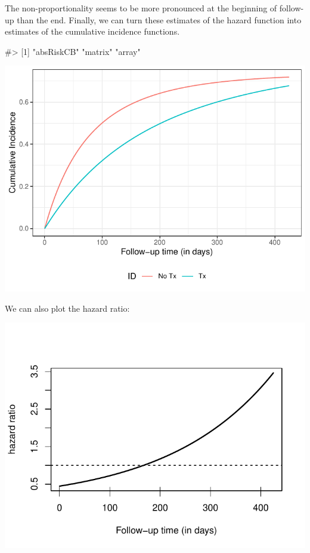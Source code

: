 \documentclass[
]{jss}
\begin{document}
The non-proportionality seems to be more pronounced at the beginning of
follow-up than the end. Finally, we can turn these estimates of the
hazard function into estimates of the cumulative incidence functions.

\begin{CodeChunk}

\begin{CodeOutput}
#> [1] "absRiskCB" "matrix"    "array"
\end{CodeOutput}


\begin{center}\includegraphics[width=\textwidth,keepaspectratio=true]{../figures/stanford-risk-1} \end{center}

\end{CodeChunk}

We can also plot the hazard ratio:

\begin{CodeChunk}


\begin{center}\includegraphics[width=\textwidth,keepaspectratio=true]{../figures/unnamed-chunk-11-1} \end{center}

\end{CodeChunk}
\end{document}
